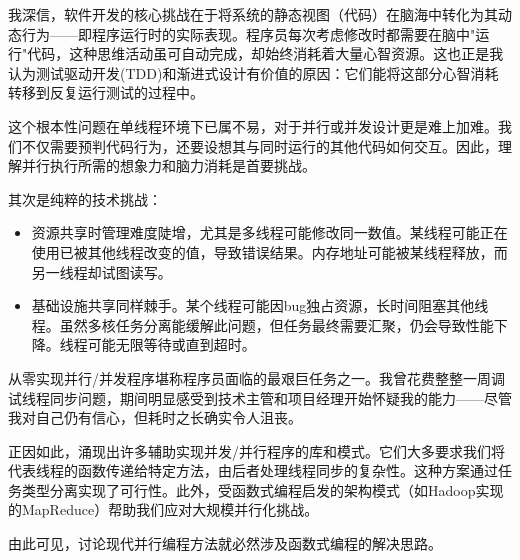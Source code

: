 我深信，软件开发的核心挑战在于将系统的静态视图（代码）在脑海中转化为其动态行为——即程序运行时的实际表现。程序员每次考虑修改时都需要在脑中"运行"代码，这种思维活动虽可自动完成，却始终消耗着大量心智资源。这也正是我认为测试驱动开发(TDD)和渐进式设计有价值的原因：它们能将这部分心智消耗转移到反复运行测试的过程中。

这个根本性问题在单线程环境下已属不易，对于并行或并发设计更是难上加难。我们不仅需要预判代码行为，还要设想其与同时运行的其他代码如何交互。因此，理解并行执行所需的想象力和脑力消耗是首要挑战。

其次是纯粹的技术挑战：

\begin{itemize}
\item 
资源共享时管理难度陡增，尤其是多线程可能修改同一数值。某线程可能正在使用已被其他线程改变的值，导致错误结果。内存地址可能被某线程释放，而另一线程却试图读写。

\item 
基础设施共享同样棘手。某个线程可能因bug独占资源，长时间阻塞其他线程。虽然多核任务分离能缓解此问题，但任务最终需要汇聚，仍会导致性能下降。线程可能无限等待或直到超时。
\end{itemize}

从零实现并行/并发程序堪称程序员面临的最艰巨任务之一。我曾花费整整一周调试线程同步问题，期间明显感受到技术主管和项目经理开始怀疑我的能力——尽管我对自己仍有信心，但耗时之长确实令人沮丧。

正因如此，涌现出许多辅助实现并发/并行程序的库和模式。它们大多要求我们将代表线程的函数传递给特定方法，由后者处理线程同步的复杂性。这种方案通过任务类型分离实现了可行性。此外，受函数式编程启发的架构模式（如Hadoop实现的MapReduce）帮助我们应对大规模并行化挑战。

由此可见，讨论现代并行编程方法就必然涉及函数式编程的解决思路。
